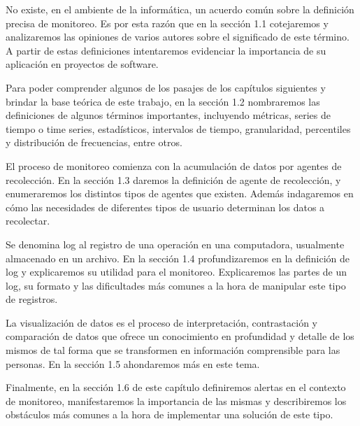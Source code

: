 No existe, en el ambiente de la informática, un acuerdo común sobre la
definición precisa de monitoreo. Es por esta razón que en la sección 1.1
cotejaremos y analizaremos las opiniones de varios autores sobre el significado
de este término. A partir de estas definiciones intentaremos evidenciar la
importancia de su aplicación en proyectos de software.

Para poder comprender algunos de los pasajes de los capítulos siguientes y
brindar la base teórica de este trabajo, en la sección 1.2 nombraremos las
definiciones de algunos términos importantes, incluyendo métricas, series de
tiempo o time series, estadísticos, intervalos de tiempo, granularidad,
percentiles y distribución de frecuencias, entre otros.

El proceso de monitoreo comienza con la acumulación de datos por agentes de
recolección. En la sección 1.3 daremos la definición de agente de recolección,
y enumeraremos los distintos tipos de agentes que existen. Además indagaremos
en cómo las necesidades de diferentes tipos de usuario determinan los datos a
recolectar.

Se denomina log al registro de una operación en una computadora, usualmente
almacenado en un archivo. En la sección 1.4 profundizaremos en la definición de
log y explicaremos su utilidad para el monitoreo. Explicaremos las partes de un
log, su formato y las dificultades más comunes a la hora de manipular este tipo
de registros.

La visualización de datos es el proceso de interpretación, contrastación y
comparación de datos que ofrece un conocimiento en profundidad y detalle de
los mismos de tal forma que se transformen en información comprensible para las
personas. En la sección 1.5 ahondaremos más en este tema.

Finalmente, en la sección 1.6 de este capítulo definiremos alertas en el
contexto de monitoreo, manifestaremos la importancia de las mismas y
describiremos los obstáculos más comunes a la hora de implementar una solución
de este tipo.


